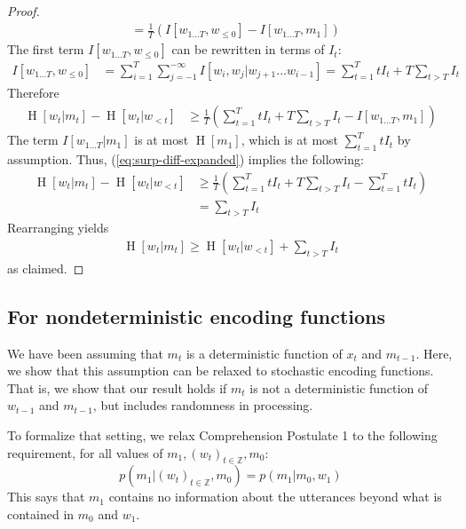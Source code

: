 \documentclass[11pt,letterpaper]{article}
\begin{document}
\begin{proof}
\begin{align}
& = \frac{1}{T} \left(I[w_{1\dots T}, w_{\leq 0}] - I[w_{1\dots T}, m_1]\right) 
\end{align}
The first term $I[w_{1\dots T}, w_{\leq 0}]$ can be rewritten in terms of $I_t$:
\begin{align}\label{eq:i-expanded}
I[w_{1\dots T}, w_{\leq 0}] &= \sum_{i=1}^T \sum_{j=-1}^{-\infty} I[w_i, w_j | w_{j+1}...w_{i-1}] = \sum_{t=1}^T t I_t + T \sum_{t > T} I_t
\end{align}
Therefore
\begin{align}\label{eq:surp-diff-expanded}
\operatorname{H}[w_t | m_t] - \operatorname{H}[w_t | w_{<t}]& \geq \frac{1}{T} \left(\sum_{t=1}^T t I_t + T \sum_{t > T} I_t - I[w_{1\dots T}, m_1]\right) 
\end{align}
The term $I[w_{1\dots T}|m_1]$ is at most $\operatorname{H}[m_1]$, which is at most $\sum_{t=1}^T t I_t$ by assumption. Thus,  (\ref{eq:surp-diff-expanded}) implies the following:
\begin{align*}
\operatorname{H}[w_t | m_t] - \operatorname{H}[w_t | w_{<t}]& \geq \frac{1}{T} \left(\sum_{t=1}^T t I_t + T \sum_{t > T} I_t - \sum_{t=1}^T t I_t\right) \\
&= \sum_{t > T} I_t
\end{align*}
Rearranging yields
\begin{align}
\operatorname{H}[w_t|m_t] \geq \operatorname{H}[w_t | w_{<t}] + \sum_{t > T} I_t
\end{align}
as claimed.
\end{proof}





\subsection{For nondeterministic encoding functions}

We have been assuming that $m_t$ is a deterministic function of $x_t$ and $m_{t-1}$.
Here, we show that this assumption can be relaxed to stochastic encoding functions.
That is, we show that our result holds if
$m_t$ is not a deterministic function of $w_{t-1}$ and $m_{t-1}$, but includes randomness in processing.

To formalize that setting, we relax Comprehension Postulate 1 to the following requirement, for all values of $m_1, (w_{t})_{t \in \mathbb{Z}}, m_0$:
\begin{equation}\label{eq:listener-markov-nondeterministic}
p(m_1| (w_{t})_{t \in \mathbb{Z}}, m_0)   = p(m_1 | m_0, w_1)
\end{equation}
This says that $m_1$ contains no information about the utterances beyond what is contained in $m_0$ and $w_1$.	
\end{document}
